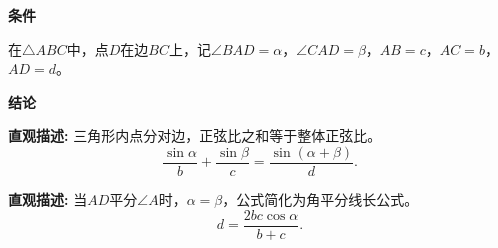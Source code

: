 \begin{statementbox}
	\textbf{\textcolor{CStatement}{条件}}
	\begin{description}[style=nextline, leftmargin=2.8em, labelsep=0.5em, itemsep=0.35em]
		\item[\textbf{\textcolor{CStatement}{条件一(点边上分点):}}] 在$\triangle ABC$中，点$D$在边$BC$上，记$\angle BAD=\alpha$，$\angle CAD=\beta$，$AB=c$，$AC=b$，$AD=d$。
	\end{description}

	\textbf{\textcolor{CStatement}{结论}}
	\begin{description}[style=nextline, leftmargin=2.8em, labelsep=0.5em, itemsep=0.45em]
		\item[\textbf{\textcolor{CStatement}{结论一(张角定理):}}]
			\textbf{\textcolor{CStatement}{直观描述:}}
			三角形内点分对边，正弦比之和等于整体正弦比。
			\[
				\frac{\sin\alpha}{b}+\frac{\sin\beta}{c}=\frac{\sin(\alpha+\beta)}{d}.
			\]

		\item[\textbf{\textcolor{CStatement}{常见变形(角平分线特例):}}]
			\textbf{\textcolor{CStatement}{直观描述:}}
			当$AD$平分$\angle A$时，$\alpha=\beta$，公式简化为角平分线长公式。
			\[
				d=\frac{2bc\cos\alpha}{b+c}.
			\]
	\end{description}
\end{statementbox}
